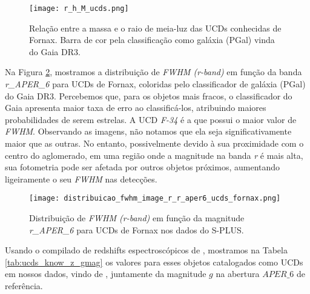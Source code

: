 \begin{figure}[!ht]
    \centering
    \texttt{[image: r\_h\_M\_ucds.png]} 
    \caption[]{Relação entre a massa e o raio de meia-luz das UCDs conhecidas de Fornax. Barra de cor pela classificação como galáxia (PGal) vinda do Gaia DR3.}
    \label{r_h_M_ucds}
\end{figure}

Na Figura \ref{distribuicao_fwhm_image_r_r_aper6_ucds_fornax}, mostramos a distribuição de \textit{FWHM (r-band)} em função da banda \textit{r\_APER\_6} para UCDs de Fornax, coloridas pelo classificador de galáxia (PGal) do Gaia DR3. Percebemos que, para os objetos mais fracos, o classificador do Gaia apresenta maior taxa de erro ao classificá-los, atribuindo maiores probabilidades de serem estrelas. A UCD \textit{F-34} é a que possui o maior valor de \textit{FWHM}. Observando as imagens, não notamos que ela seja significativamente maior que as outras. No entanto, possivelmente devido à sua proximidade com o centro do aglomerado, em uma região onde a magnitude na banda \textit{r} é mais alta, sua fotometria pode ser afetada por outros objetos próximos, aumentando ligeiramente o seu \textit{FWHM} nas detecções.

\begin{figure}[!ht]
    \centering
    \texttt{[image: distribuicao\_fwhm\_image\_r\_r\_aper6\_ucds\_fornax.png]}
    \caption[]{Distribuição de \textit{FWHM (r-band)} em função da magnitude \textit{r\_APER\_6} para UCDs de Fornax nos dados do S-PLUS.}
    \label{distribuicao_fwhm_image_r_r_aper6_ucds_fornax}
\end{figure}

Usando o compilado de redshifts espectroscópicos de \cite{Lima_2024}, mostramos na Tabela \ref{tab:ucds_know_z_gmag} os valores para esses objetos catalogados como UCDs em nossos dados, vindo de \cite{catalog_ucds}, juntamente da magnitude $g$ na abertura $APER\_6$ de referência. 

